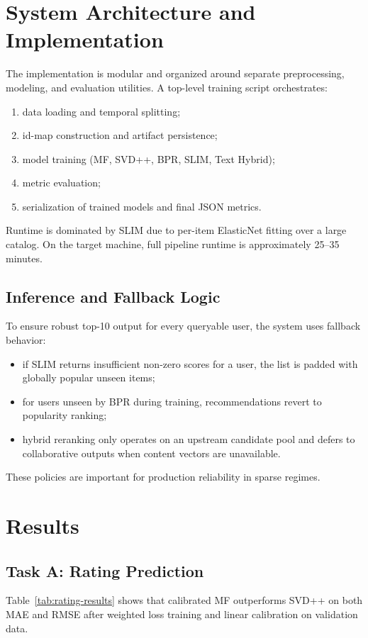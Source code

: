 \documentclass[sigconf,nonacm]{acmart}
\begin{document}
\section{System Architecture and Implementation}
The implementation is modular and organized around separate preprocessing, modeling, and evaluation utilities. A top-level training script orchestrates:
\begin{enumerate}
  \item data loading and temporal splitting;
  \item id-map construction and artifact persistence;
  \item model training (MF, SVD++, BPR, SLIM, Text Hybrid);
  \item metric evaluation;
  \item serialization of trained models and final JSON metrics.
\end{enumerate}

Runtime is dominated by SLIM due to per-item ElasticNet fitting over a large catalog. On the target machine, full pipeline runtime is approximately 25--35 minutes.

\subsection{Inference and Fallback Logic}
To ensure robust top-10 output for every queryable user, the system uses fallback behavior:
\begin{itemize}
  \item if SLIM returns insufficient non-zero scores for a user, the list is padded with globally popular unseen items;
  \item for users unseen by BPR during training, recommendations revert to popularity ranking;
  \item hybrid reranking only operates on an upstream candidate pool and defers to collaborative outputs when content vectors are unavailable.
\end{itemize}

These policies are important for production reliability in sparse regimes.

\section{Results}

\subsection{Task A: Rating Prediction}
Table~\ref{tab:rating-results} shows that calibrated MF outperforms SVD++ on both MAE and RMSE after weighted loss training and linear calibration on validation data.
\end{document}

